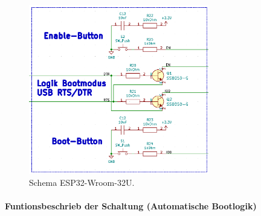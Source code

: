 \begin{figure}[h!]
	\centering
	\includegraphics[width=0.7\textwidth]{graphics/Schema_ESP32_Flashbuttons}
	\caption{Schema ESP32-Wroom-32U.}
	\label{fig:Schema_ESP32_Flashbuttons}
\end{figure}

\newpage

\paragraph{Funtionsbeschrieb der Schaltung (Automatische Bootlogik)}\mbox{}

